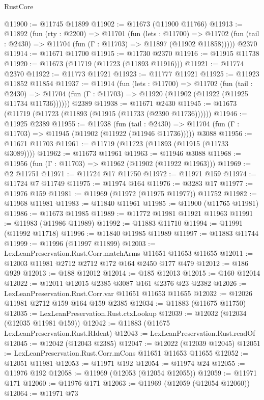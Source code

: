 \begin{lexlean}{RustCore}
\begin{coremodule}
@11900 := @11745 @11899
@11902 := @11673 (@11900 @11766)
@11913 := @11892
    (fun (rty : @2200) =>
    @11701
      (fun (lets : @11700) =>
      @11702 (fun (tail : @2430) => @11704 (fun (Γ : @11703) => @11897 (@11902 @11858)))))
    @2370
@11914 := @11671 @11700
@11915 := @11730 @2370
@11916 := @11915 @11738
@11920 := @11673 (@11719 (@11723 (@11893 @11916)))
@11921 := @11774 @2370
@11922 := @11773 @11921
@11923 := @11777 @11921
@11925 := @11923 @11852 @11854
@11937 := @11914
    (fun (lets : @11700) =>
    @11702
      (fun (tail : @2430) =>
      @11704 (fun (Γ : @11703) => @11920 (@11902 (@11922 (@11925 @11734 @11736))))))
    @2389
@11938 := @11671 @2430
@11945 := @11673 (@11719 (@11723 (@11893 (@11915 (@11733 (@2390 @11736))))))
@11946 := @11925 @2389
@11955 := @11938
    (fun (tail : @2430) => @11704 (fun (Γ : @11703) => @11945 (@11902 (@11922 (@11946 @11736)))))
    @3088
@11956 := @11671 @11703
@11961 := @11719 (@11723 (@11893 (@11915 (@11733 @3089))))
@11962 := @11673 @11961
@11963 := @11946 @3088
@11968 := @11956 (fun (Γ : @11703) => @11962 (@11902 (@11922 @11963)))
@11969 := @2 @11751
@11971 := @11724 @17 @11750
@11972 := @11971 @159
@11974 := @11724 @7 @11749
@11975 := @11974 @164
@11976 := @3283 @17
@11977 := @11976 @159
@11981 := @11969 (@11972 (@11975 @11977)) @11752
@11982 := @11968 @11981
@11983 := @11840 @11961
@11985 := @11900 (@11765 @11981)
@11986 := @11673 @11985
@11989 := @11772 @11981 @11921 @11963
@11991 := @11983 (@11986 @11989)
@11992 := @11883 @11710
@11994 := @11991 (@11992 @11718)
@11996 := @11840 @11985 @11989
@11997 := @11883 @11744
@11999 := @11996 (@11997 @11899)
@12003 := LexLeanPreservation.Rust.Corr.matchArms @11651 @11653 @11655
@12011 := @12003 @11981 @2712 @2712 @172 @164 @2450 @177 @479
@12012 := @186 @929
@12013 := @188 @12012
@12014 := @185 @12013
@12015 := @160 @12014
@12022 := @12011 @12015 @2385 @3087 @161 @2376 @23 @2382
@12026 := LexLeanPreservation.Rust.Corr.var @11651 @11653 @11655
@12032 := @12026 @11981 @2712 @159 @164 @159 @2385
@12034 := @11883 (@11675 @11750)
@12035 := LexLeanPreservation.Rust.ctxLookup
@12039 := @12032 (@12034 (@12035 @11981 @159))
@12042 := @11883 (@11675 LexLeanPreservation.Rust.RIdent)
@12043 := LexLeanPreservation.Rust.readOf
@12045 := @12042 (@12043 @2385)
@12047 := @12022 (@12039 @12045)
@12051 := LexLeanPreservation.Rust.Corr.mCons @11651 @11653 @11655
@12052 := @12051 @11981
@12053 := @11971 @192
@12054 := @11974 @24
@12055 := @11976 @192
@12058 := @11969 (@12053 (@12054 @12055))
@12059 := @11971 @171
@12060 := @11976 @171
@12063 := @11969 (@12059 (@12054 @12060))
@12064 := @11971 @73

\end{coremodule}
\end{lexlean}
